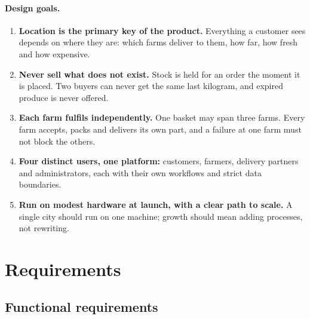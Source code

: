 \documentclass[11pt,a4paper]{article}
\begin{document}
\paragraph{Design goals.}
\begin{enumerate}
  \item \textbf{Location is the primary key of the product.} Everything a customer sees depends on where they are: which farms deliver to them, how far, how fresh and how expensive.
  \item \textbf{Never sell what does not exist.} Stock is held for an order the moment it is placed. Two buyers can never get the same last kilogram, and expired produce is never offered.
  \item \textbf{Each farm fulfils independently.} One basket may span three farms. Every farm accepts, packs and delivers its own part, and a failure at one farm must not block the others.
  \item \textbf{Four distinct users, one platform:} customers, farmers, delivery partners and administrators, each with their own workflows and strict data boundaries.
  \item \textbf{Run on modest hardware at launch, with a clear path to scale.} A single city should run on one machine; growth should mean adding processes, not rewriting.
\end{enumerate}

\section{Requirements}

\subsection{Functional requirements}
\end{document}
